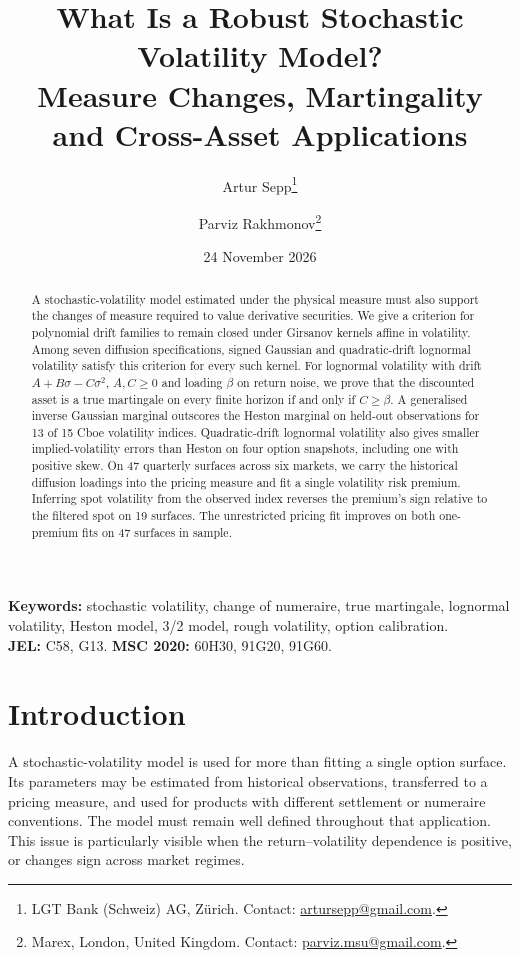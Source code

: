 \documentclass[11pt,a4paper]{article}
\title{What Is a Robust Stochastic Volatility Model?\\
 \large Measure Changes, Martingality and Cross-Asset Applications}
\author{Artur Sepp\thanks{LGT Bank (Schweiz) AG, Z\"urich. Contact: \href{mailto:artursepp@gmail.com}{artursepp@gmail.com}.}
 \and Parviz Rakhmonov\thanks{Marex, London, United Kingdom. Contact: \href{mailto:parviz.msu@gmail.com}{parviz.msu@gmail.com}.}}
\date{24 November 2026}
\theoremstyle{definition}
\theoremstyle{remark}
\newcommand{\panelCount}{15}
\newcommand{\panelGigWins}{13}
\newcommand{\quarterlySurfaceCount}{47}
\newcommand{\quarterlySignFlips}{19}
\newcommand{\quarterlyBothWins}{47}
\begin{document}
\maketitle

\begin{abstract}
A stochastic-volatility model estimated under the physical measure must also support the changes of measure required to value derivative securities. We give a criterion for polynomial drift families to remain closed under Girsanov kernels affine in volatility. Among seven diffusion specifications, signed Gaussian and quadratic-drift lognormal volatility satisfy this criterion for every such kernel. For lognormal volatility with drift $A+B\sigma-C\sigma^2$, $A,C\geq0$ and loading $\beta$ on return noise, we prove that the discounted asset is a true martingale on every finite horizon if and only if $C\geq\beta$. A generalised inverse Gaussian marginal outscores the Heston marginal on held-out observations for \panelGigWins{} of \panelCount{} Cboe volatility indices. Quadratic-drift lognormal volatility also gives smaller implied-volatility errors than Heston on four option snapshots, including one with positive skew. On \quarterlySurfaceCount{} quarterly surfaces across six markets, we carry the historical diffusion loadings into the pricing measure and fit a single volatility risk premium. Inferring spot volatility from the observed index reverses the premium's sign relative to the filtered spot on \quarterlySignFlips{} surfaces. The unrestricted pricing fit improves on both one-premium fits on \quarterlyBothWins{} surfaces in sample.
\end{abstract}

\noindent\textbf{Keywords:} stochastic volatility, change of numeraire, true martingale, lognormal volatility, Heston model, 3/2 model, rough volatility, option calibration.\\
\textbf{JEL:} C58, G13. \quad \textbf{MSC 2020:} 60H30, 91G20, 91G60.

\section{Introduction}
\label{sec:introduction}

A stochastic-volatility model is used for more than fitting a single option surface. Its parameters may be estimated from historical observations, transferred to a pricing measure, and used for products with different settlement or numeraire conventions. The model must remain well defined throughout that application. This issue is particularly visible when the return--volatility dependence is positive, or changes sign across market regimes.
\end{document}
